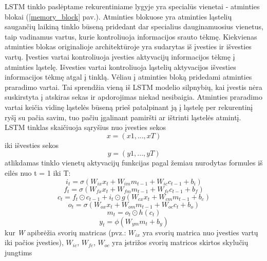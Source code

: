 \documentclass{VUMIFInfBakalaurinis}
\begin{document}
LSTM tinklo paslėptame rekurentiniame lygyje yra specialūs vienetai - atminties blokai (\ref{memory_block} pav.).
Atminties blokuose yra atminties ląstelių saugančių laikiną tinklo būseną pridedant dar specialius 
dauginamuosius vienetus, taip vadinamus vartus, kurie kontroliuoja informacijos srauto tėkmę.
Kiekvienas atminties blokas originalioje architektūroje yra sudarytas iš įvesties ir išvesties vartų.
Įvesties vartai kontroliuoja įvesties aktyvacijų informacijos tėkmę į atminties ląstelę.
Išvesties vartai kontroliuoja ląstelių aktyvacijos išvesties informacijos tėkmę atgal į tinklą.
Vėliau į atminties bloką pridedami atminties praradimo vartai. 
Tai sprendžia vieną iš LSTM modelio silpnybių, kai įvestis nėra suskirstyta į atskiras sekas ir apdorojimas niekad nesibaigia.
Atminties praradimo vartai keičia vidinę ląstelės būseną prieš patalpinant ją į ląstelę per rekurentinį ryšį su pačia savim,
tuo pačiu įgalinant pamiršti ar ištrinti ląstelės atmintį.
LSTM tinklas skaičiuoja sąryšius nuo įvesties sekos
\begin{equation}
  x = (x1, ..., xT) 
\end{equation}
iki išvesties sekos
\begin{equation}
  y = (y1, ..., yT)
\end{equation}
atlikdamas tinklo vienetų aktyvacijų funkcijas pagal žemiau nurodytas formules iš eilės nuo t = 1 iki T:
\begin{equation}
  i_t = \sigma(W_{ix}x_t + W_{im}m_{t−1} + W_{ic}c_{t−1} + b_i)
\end{equation}
\begin{equation}
  f_t = \sigma(W_{fx}x_t + W_{fm}m_{t−1} + W_{fc}c_{t−1} + b_f)
\end{equation}
\begin{equation}
  c_t = f_t \odot c_{t−1} + i_t\odot g(W_{cx}x_t + W_{cm}m_{t−1} + b_c)
\end{equation}
\begin{equation}
  o_t = \sigma(W_{ox}x_t + W_{om}m_{t−1} + W_{oc}c_t + b_o)
\end{equation}
\begin{equation}
  m_t = o_t \odot h(c_t)
\end{equation}
\begin{equation}
  y_t = \phi(W_{ym}m_t + b_y)
\end{equation}
kur \textit{W} apibrėžia svorių matricas (pvz.: \(W_{ix}\) yra svorių matrica nuo įvesties vartų iki pačios įvesties), 
\(W_{ic}\), \(W_{fc}\), \(W_{oc}\) yra įstrižos svorių matricos skirtos skylučių jungtims
\end{document}
